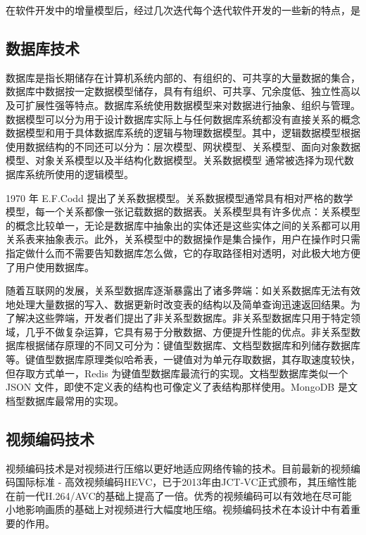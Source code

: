 在软件开发中的增量模型后，经过几次迭代每个迭代软件开发的一些新的特点，是

\subsection{数据库技术}

数据库是指长期储存在计算机系统内部的、有组织的、可共享的大量数据的集合，数据库中数据按一定数据模型储存，具有有组织、可共享、冗余度低、独立性高以及可扩展性强等特点\cite{王珊2006数据库系统概论}。数据库系统使用数据模型来对数据进行抽象、组织与管理。数据模型可以分为用于设计数据库实际上与任何数据库系统都没有直接关系的概念数据模型和用于具体数据库系统的逻辑与物理数据模型。其中，逻辑数据模型根据使用数据结构的不同还可以分为：层次模型、网状模型、关系模型、面向对象数据模型、对象关系模型以及半结构化数据模型。关系数据模型\cite{bachman1972evolution} 通常被选择为现代数据库系统所使用的逻辑模型。

1970 年 E.F.Codd 提出了关系数据模型。关系数据模型通常具有相对严格的数学模型，每一个关系都像一张记载数据的数据表。关系模型具有许多优点：关系模型的概念比较单一，无论是数据库中抽象出的实体还是这些实体之间的关系都可以用关系表来抽象表示\cite{codd1970relational}。此外，关系模型中的数据操作是集合操作，用户在操作时只需指定做什么而不需要告知数据库怎么做，它的存取路径相对透明，对此极大地方便了用户使用数据库。

随着互联网的发展，关系型数据库逐渐暴露出了诸多弊端：如关系数据库无法有效地处理大量数据的写入、数据更新时改变表的结构以及简单查询迅速返回结果。为了解决这些弊端，开发者们提出了非关系型数据库。非关系型数据库只用于特定领域，几乎不做复杂运算，它具有易于分散数据、方便提升性能的优点。非关系型数据库根据储存原理的不同又可分为：键值型数据库、文档型数据库和列储存数据库等\cite{strauch2011nosql}。键值型数据库原理类似哈希表，一键值对为单元存取数据，其存取速度较快，但存取方式单一，Redis 为键值型数据库最流行的实现。文档型数据库类似一个 JSON 文件，即使不定义表的结构也可像定义了表结构那样使用。MongoDB 是文档型数据库最常用的实现。

\subsection{视频编码技术}

视频编码技术是对视频进行压缩以更好地适应网络传输的技术。目前最新的视频编码国际标准 - 高效视频编码HEVC，已于2013年由JCT-VC正式颁布，其压缩性能在前一代H.264/AVC的基础上提高了一倍。优秀的视频编码可以有效地在尽可能小地影响画质的基础上对视频进行大幅度地压缩\cite{万帅2014新一代高效视频编码}。视频编码技术在本设计中有着重要的作用。


